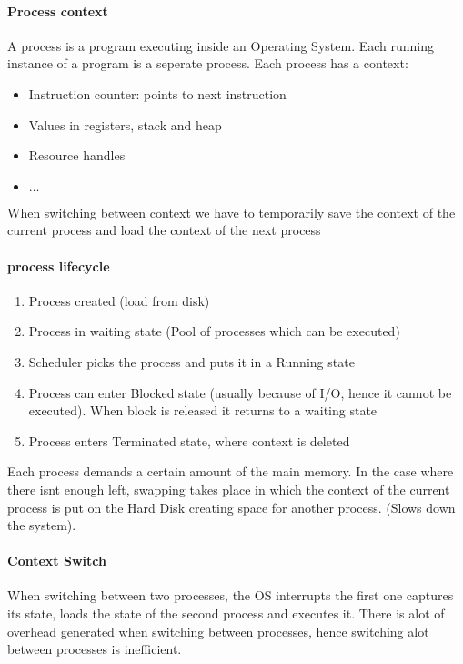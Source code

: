 \documentclass[8pt]{extreport}
\begin{document}
\paragraph{Process context}
A process is a program executing inside an Operating System. Each running instance of a program is a seperate process.
Each process has a context:
\begin{itemize}
\item Instruction counter: points to next instruction
\item Values in registers, stack and heap
\item Resource handles
\item $\dots$
\end{itemize}
When switching between context we have to temporarily save the context of the current process and load the context of the next process

\paragraph{process lifecycle}
\begin{enumerate}
\item Process created (load from disk)
\item Process in waiting state (Pool of processes which can be executed)
\item Scheduler picks the process and puts it in a Running state
\item Process can enter Blocked state (usually because of I/O, hence it cannot be executed). When block is released it returns to a waiting state
\item Process enters Terminated state, where context is deleted
\end{enumerate}
Each process demands a certain amount of the main memory. In the case where there isnt enough left, swapping takes place in which the context of the current process is put on the Hard Disk creating space for another process. (Slows down the system).
\paragraph{Context Switch} When switching between two processes, the OS interrupts the first one captures its state, loads the state of the second process and executes it. There is alot of overhead generated when switching between processes, hence switching alot between processes is inefficient.
\end{document}
